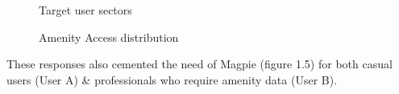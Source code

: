 \documentclass{report}
\begin{document}
\begin{figure}
    \centering
    \begin{minipage}{0.45\textwidth}
        \centering
        \caption{Target user sectors}
        \label{fig:plot1}
    \end{minipage}
    \hfill
    \begin{minipage}{0.45\textwidth}
        \centering
        \caption{Amenity Access distribution}
        \label{fig:plot2}
    \end{minipage}
\end{figure}
These responses also cemented the need of Magpie (figure 1.5) for both casual
users (User A) \& professionals who require amenity data (User B).
\end{document}
